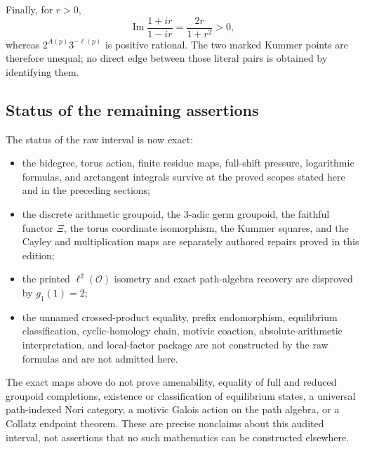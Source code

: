 Finally, for $r>0$,
\[
 \operatorname{Im}\frac{1+ir}{1-ir}=\frac{2r}{1+r^2}>0,
\]
whereas $2^{A(p)}3^{-\ell(p)}$ is positive rational.  The two marked Kummer
points are therefore unequal; no direct edge between those literal pairs is
obtained by identifying them.

\subsection{Status of the remaining assertions}

The status of the raw interval is now exact:
\begin{itemize}
\item the bidegree, torus action, finite residue maps, full-shift pressure,
  logarithmic formulas, and arctangent integrals survive at the proved scopes
  stated here and in the preceding sections;
\item the discrete arithmetic groupoid, the $3$-adic germ groupoid, the
  faithful functor $\Xi$, the torus coordinate isomorphism, the Kummer
  squares, and the Cayley and multiplication maps are separately authored
  repairs proved in this edition;
\item the printed $\ell^2(\mathcal O)$ isometry and exact path-algebra
  recovery are disproved by $g_1(1)=2$;
\item the unnamed crossed-product equality, prefix endomorphism, equilibrium
  classification, cyclic-homology chain, motivic coaction, absolute-arithmetic
  interpretation, and local-factor package are not constructed by the raw
  formulas and are not admitted here.
\end{itemize}

\begin{nonclaim}
The exact maps above do not prove amenability, equality of full and reduced
groupoid completions, existence or classification of equilibrium states, a
universal path-indexed Nori category, a motivic Galois action on the path
algebra, or a Collatz endpoint theorem.  These are precise nonclaims about
this audited interval, not assertions that no such mathematics can be
constructed elsewhere.
\end{nonclaim}
